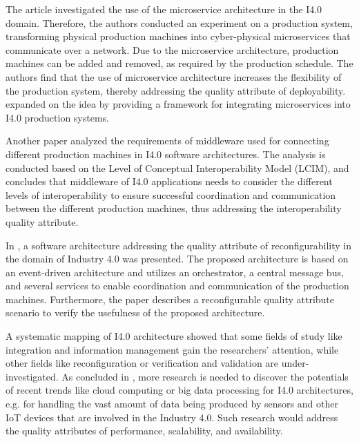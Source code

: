 \documentclass[conference]{IEEEtran}
\begin{document}
The article \cite{thramboulidis_cyber-physical_2018} investigated the use of the microservice architecture in the I4.0 domain. Therefore, the authors conducted an experiment on a production system, transforming physical production machines into cyber-physical microservices that communicate over a network. Due to the microservice architecture, production machines can be added and removed, as required by the production schedule. The authors find that the use of microservice architecture increases the flexibility of the production system, thereby addressing the quality attribute of deployability. \cite{thramboulidis_cpus-iot_2019} expanded on the idea by providing a framework for integrating microservices into I4.0 production systems.

Another paper \cite{jepsen_industry_2021} analyzed the requirements of middleware used for connecting different production machines in I4.0 software architectures. The analysis is conducted based on the Level of Conceptual Interoperability Model (LCIM), and concludes that middleware of I4.0 applications needs to consider the different levels of interoperability to ensure successful coordination and communication between the different production machines, thus addressing the interoperability quality attribute.

In \cite{jepsen_reconfigurable_2023}, a software architecture addressing the quality attribute of reconfigurability in the domain of Industry 4.0 was presented. The proposed architecture is based on an event-driven architecture and utilizes an orchestrator, a central message bus, and several services to enable coordination and communication of the production machines. Furthermore, the paper describes a reconfigurable quality attribute scenario to verify the usefulness of the proposed architecture.

A systematic mapping of I4.0 architecture \cite{hofer_architecture_2018} showed that some fields of study like integration and information management gain the researchers' attention, while other fields like reconfiguration or verification and validation are under-investigated. As concluded in \cite{pivoto_cyber-physical_2021}, more research is needed to discover the potentials of recent trends like cloud computing or big data processing for I4.0 architectures, e.g. for handling the vast amount of data being produced by sensors and other IoT devices that are involved in the Industry 4.0. Such research would address the quality attributes of performance, scalability, and availability.
\end{document}

